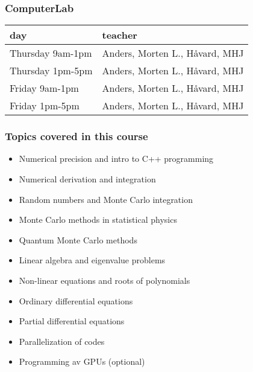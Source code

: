 \documentclass[compress]{beamer}
\begin{document}
\frame
{
  \frametitle{ComputerLab}
  \begin{block}{}
\begin{tabular} {ll} \\ \hline
                day & teacher \\ \hline
                Thursday 9am-1pm& Anders, Morten L., H\aa vard, MHJ\\
                Thursday 1pm-5pm&  Anders, Morten L., H\aa vard, MHJ\\
                Friday 9am-1pm&  Anders, Morten L., H\aa vard, MHJ\\
                Friday 1pm-5pm&  Anders, Morten L., H\aa vard, MHJ\\ \hline

\end{tabular}\newline\newline
\end{block}
}










\frame
{
  \frametitle{Topics covered in this course}
  \begin{block}{}
\begin{small}
{\scriptsize
        \begin{itemize}
          \item Numerical precision and  intro to C++ programming
          \item Numerical derivation and integration
          \item Random numbers and Monte Carlo integration
          \item Monte Carlo methods in statistical physics
          \item Quantum Monte Carlo methods
          \item Linear algebra and eigenvalue problems
          \item Non-linear equations and roots of polynomials
          \item Ordinary differential equations
          \item Partial differential equations
          \item Parallelization of codes
          \item Programming av GPUs (optional)
         \end{itemize}
}
\end{small}
  \end{block}
}
\end{document}
